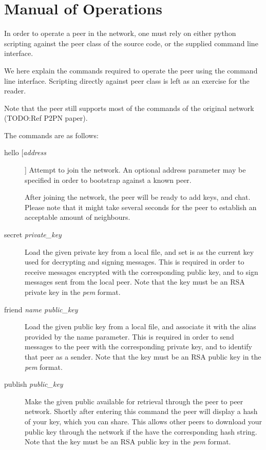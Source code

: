 \section{Manual of Operations}

In order to operate a peer in the network, one must rely on either python scripting against the peer class of the source code, or the supplied command line interface.

We here explain the commands required to operate the peer using the command line interface. Scripting directly against peer class is left as an exercise for the reader.

Note that the peer still supports most of the commands of the original network (TODO:Ref P2PN paper).

The commands are as follows:

\begin{description}
\item[hello [\textit{address}]] Attempt to join the network. An optional address parameter may be specified in order to bootstrap against a known peer.

After joining the network, the peer will be ready to add keys, and chat. Please note that it might take several seconds for the peer to establish an acceptable amount of neighbours.

\item[secret \textit{private\_key}]
Load the given private key from a local file, and set is as the current key used for decrypting and signing messages. 
This is required in order to receive messages encrypted with the corresponding public key, and to sign messages sent from the local peer.
Note that the key must be an RSA private key in the \textit{pem} format.

\item[friend \textit{name public\_key}]
Load the given public key from a local file, and associate it with the alias provided by the name parameter. 
This is required in order to send messages to the peer with the corresponding private key, and to identify that peer as a sender.
Note that the key must be an RSA public key in the \textit{pem} format.

\item[publish \textit{public\_key}]
Make the given public available for retrieval through the peer to peer network. Shortly after entering this command the peer will display a hash of your key, which you can share. This allows other peers to download your public key through the network if the have the corresponding hash string.
Note that the key must be an RSA public key in the \textit{pem} format.


\end{description}
